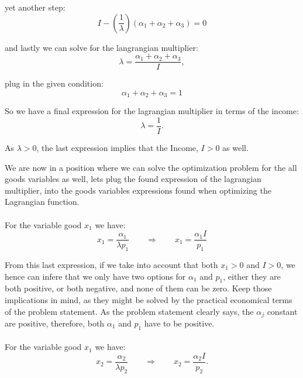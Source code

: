 \documentclass{article}
\begin{document}
yet another step:
\begin{equation}
   I - \left( \frac{1}{\lambda} \right) (\alpha_1 + \alpha_2+ \alpha_3) = 0
\end{equation}

and lastly we can solve for the langrangian multiplier:
\begin{equation}
   \lambda =  \frac{\alpha_1 + \alpha_2+ \alpha_3}{I},
\end{equation}

plug in the given condition:
\begin{equation}
  \alpha_1 + \alpha_2+ \alpha_3 = 1
\end{equation}

So we have a final expression for the lagrangian multiplier in terms of the income:
\begin{equation}
   \lambda =  \frac{1}{I}.
\end{equation}

As $\lambda > 0$, the last expression implies that the Income, $I > 0$ as well.

\medskip

We are now in a position where we can solve the optimization problem for the all goods variables as well, lets plug the found expression of the lagrangian multiplier, into the goods variables expressions found when optimizing the Lagrangian function.

\paragraph{}
For the variable good $x_1$ we have:
\begin{equation}
  x_1 = \frac{\alpha_1}{\lambda p_1} \qquad \Rightarrow \qquad x_1 = \frac{\alpha_1 I}{ p_1}
\end{equation}

From this last expression, if we take into account that both $x_1 > 0$ and $I > 0$, we hence can infere that we only have two options for $\alpha_1$ and $p_1$, either they are both positive, or both negative, and none of them can be zero. Keep those implications in mind, as they might be solved by the practical economical terms of the problem statement. As the problem statement clearly says, the $\alpha_j$ constant are positive, therefore, both $\alpha_1$ and $p_1$ have to be positive.

\paragraph{}
For the variable good $x_1$ we have:
\begin{equation}
  x_2 = \frac{\alpha_2}{\lambda p_2} \qquad \Rightarrow \qquad x_2 = \frac{\alpha_2 I}{ p_2}.
\end{equation}
\end{document}

